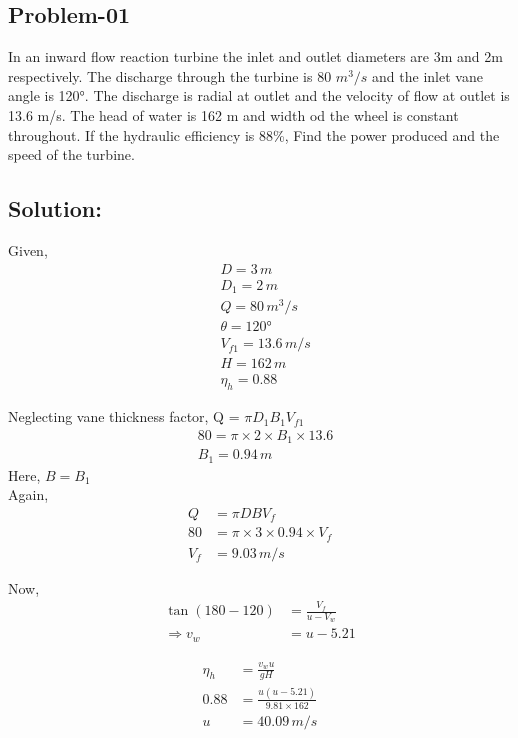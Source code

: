 \documentclass{article}
\begin{document}
\begin{multicols}{2}  
  \subsection*{Problem-01}
  In an inward flow reaction turbine the inlet and outlet diameters are 3m and 2m respectively. The discharge through the turbine is 80 $m^3/s$ and the inlet vane angle is 120°. The discharge is radial at outlet and the velocity of flow at outlet is 13.6 m/s. The head of water is 162 m and width od the wheel is constant throughout. If the hydraulic efficiency is 88\%, Find the power produced and the speed of the turbine.

  \subsection*{Solution:}
  Given,
  \begin{align*}
    & D = 3 \, m \\
    & D_1 = 2 \, m \\
    & Q = 80 \, m^3/s \\
    & \theta = 120° \\
    & V_{f1} = 13.6 \, m/s \\
    & H = 162 \, m \\
    & \eta_h = 0.88
  \end{align*}

  Neglecting vane thickness factor,
  Q = $\pi D_1 B_1 V_{f1}$ \\
  \begin{align*}
    & 80 = \pi \times 2 \times B_1 \times 13.6 \\
    & B_1 = 0.94 \, m
  \end{align*}
  Here, $B = B_1$\\
  Again,
  \begin{align*}
    Q &= \pi D B V_f \\
    80 &= \pi \times 3 \times 0.94 \times V_f \\
    V_f &= 9.03 \, m/s
  \end{align*}

  Now, 
  \begin{align*}
    \tan (180-120) &= \frac{V_f}{u-V_{w}} \\
    \Rightarrow v_w &= u - 5.21 
  \end{align*}

  \begin{align*}
    \eta_h &= \frac{v_w u}{gH} \\
    0.88 &= \frac{u(u-5.21)}{9.81 \times 162} \\
    u &= 40.09 \, m/s
  \end{align*}


\end{multicols}
\end{document}
